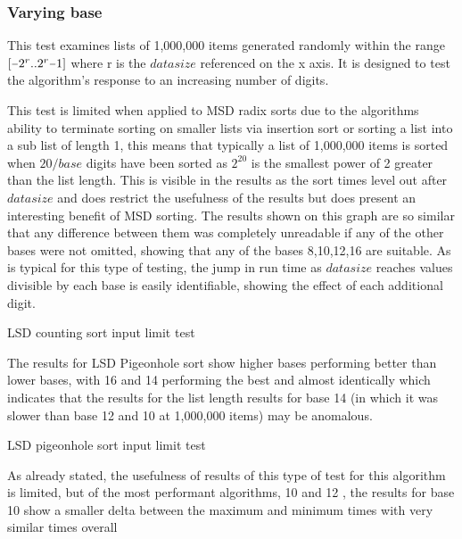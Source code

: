 \documentclass[12pt]{article}
\newcommand{\minus}{\scalebox{0.75}[1.0]{$-$}}
\begin{document}
	\subsubsection{Varying base}
	This test examines lists of 1,000,000 items generated randomly within the range $[\minus2^r..2^r\minus1]$ where r is the $data$\textunderscore $size$ referenced on the x axis. It is designed to test the algorithm's response to an increasing number of digits.
	\par
	This test is limited when applied to MSD radix sorts due to the algorithms ability to terminate sorting on smaller lists via insertion sort or sorting a list into a sub list of length 1, this means that typically a list of 1,000,000 items is sorted when $20/{base}$ digits have been sorted as $2^{20}$ is the smallest power of 2 greater than the list length. This is visible in the results as the sort times level out after $data$\textunderscore $size$ and does restrict the usefulness of the results but does present an interesting benefit of MSD sorting.
	The results shown on this graph are so similar that any difference between them was completely unreadable if any of the other bases were not omitted, showing that any of the bases 8,10,12,16 are suitable. As is typical for this type of testing, the jump in run time as $data$\textunderscore $size$ reaches values divisible by each base is easily identifiable, showing the effect of each additional digit.
	\begin{table}[h]
		\centering
			\caption*{LSD counting sort input limit test}
	\end{table}
	\vspace{-1cm}
	The results for LSD Pigeonhole sort show higher bases performing better than lower bases, with 16 and 14 performing the best and almost identically which indicates that the results for the list length results for base 14 (in which it was slower than base 12 and 10 at 1,000,000 items) may be anomalous.
	\begin{table}[h]
		\centering
			\caption*{LSD pigeonhole sort input limit test}
	\end{table}
	As already stated, the usefulness of results of this type of test for this algorithm is limited, but of the most performant algorithms, 10 and 12 , the results for base 10 show a smaller delta between the maximum and minimum times with very similar times overall
\end{document}
